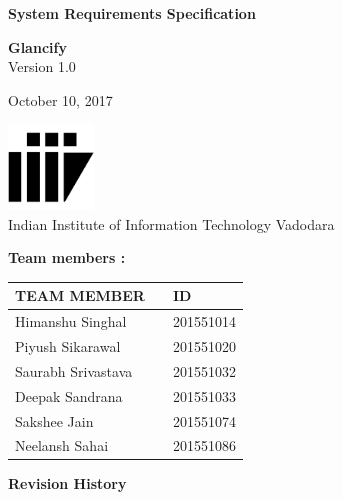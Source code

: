 \documentclass[12pt]{article}
\renewcommand{\today}{October  10, 2017}
\begin{document}
\begin{titlepage}
		\begin{center}
			
			
			\LARGE{\textbf{System Requirements Specification}}
			
			\vspace{1.5cm}
			
			\textbf{Glancify}\\
			
			\small{Version 1.0}
			\vspace{2cm}
		 
        	
			
			\vspace{1.5cm}
			
			\today
			
			\vspace{5cm}
			\includegraphics[width=0.17\textwidth]{iiitv.png} \\
			\Large{Indian Institute of Information Technology Vadodara} \\
			
		\end{center}
	\end{titlepage}
\newpage
\textbf{Team members :} \\
\begin{center}
	\begin{tabular}{ |m{10em} m{8em} m{9em}|}
		\hline
		TEAM MEMBER        &   & ID        \\
		\hline
		Himanshu Singhal             &   & 201551014 \\
		Piyush Sikarawal          &   & 201551020 \\
		Saurabh Srivastava              &   & 201551032 \\
	    Deepak Sandrana     &   & 201551033 \\
		Sakshee Jain    &   & 201551074 \\
		Neelansh Sahai    &   & 201551086 \\ 
		\hline
	\end{tabular}
	
\end{center}
\newpage
\textbf{Revision History}
\end{document}
